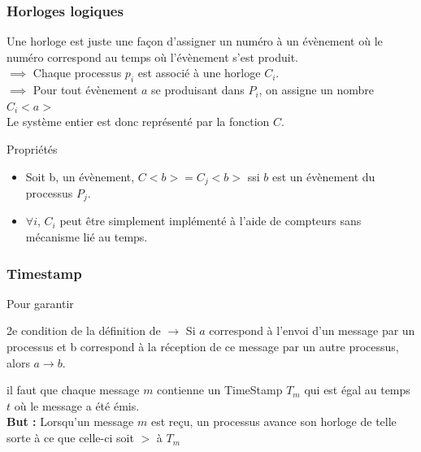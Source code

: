 \documentclass[compress]{beamer}
\begin{document}
\begin{frame}
\frametitle{Horloges logiques}
Une horloge est juste une façon d'assigner un numéro à un évènement où le numéro correspond au temps où l'évènement s'est produit.\\
$\implies$ Chaque processus $p_i$ est associé à une horloge $C_i$.\\
$\implies$ Pour tout évènement $a$ se produisant dans $P_i$, on assigne un nombre $C_i<a>$ \\
Le système entier est donc représenté par la fonction $C$.\\
\begin{block}{Propriétés}
\begin{itemize}
\item Soit b, un évènement, $C<b> = C_j<b>$ ssi $b$ est un évènement du processus $P_j$.\\
\item $\forall i$, $C_i$ peut être simplement implémenté à l'aide de compteurs sans mécanisme lié au temps.
\end{itemize} 
\end{block}
\end{frame}

\begin{frame}
	\frametitle{Timestamp}
	Pour garantir
	\begin{block}{2e condition de la définition de $\rightarrow$}
		Si $a$ correspond à l'envoi d'un message par un processus et b correspond à la réception de ce message par un autre processus, alors $a \rightarrow b$.
	\end{block}
	il faut que chaque message $m$ contienne un TimeStamp $T_m$ qui est égal au temps $t$ où le message a été émis. \\
	\textbf{But : }Lorsqu'un message $m$ est reçu, un processus avance son horloge de telle sorte à ce que celle-ci soit $>$ à $T_m$

\end{frame}
\end{document}
